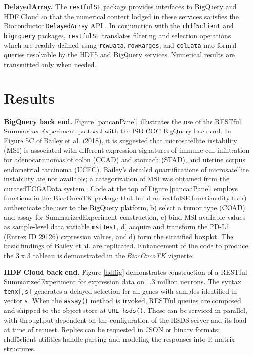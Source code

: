\documentclass[applications]{gen-bioinformatics}
\newcommand{\Rpackage}[1]{{\textit{#1}}}
\begin{document}
\noindent
\textbf{DelayedArray.}
The \verb+restfulSE+ package provides interfaces to 
BigQuery and HDF Cloud so that 
the numerical content lodged in these services
satisfies the Bioconductor \verb+DelayedArray+ API \citep{Pages2018}.  
In conjunction with the \verb+rhdf5client+ and \verb+bigrquery+ packages,
\verb+restfulSE+ translates filtering and selection operations
which are readily defined using \verb+rowData+, \verb+rowRanges+,
and \verb+colData+ into formal queries resolvable by the HDF5 and
BigQuery services.  Numerical results are transmitted only when needed.

\section*{Results}

\textbf{BigQuery back end.} Figure \ref{pancanPanel} illustrates the 
use of the RESTful SummarizedExperiment protocol
with the ISB-CGC BigQuery back end.  In Figure 5C
of Bailey et al. (2018), it is suggested that
microsatellite instability (MSI) is associated with
different expression signatures of immune cell infiltration
for adenocarcinomas of colon (COAD) and stomach (STAD), and
uterine corpus endometrial carcinoma (UCEC).  Bailey's
detailed quantifications of microsatellite instability
are not available; a categorization of MSI was
obtained from the curatedTCGAData system \citep{Ramos2017}.
Code at the top of Figure \ref{pancanPanel} employs
functions in the BiocOncoTK package that build on
restfulSE functionality to a) authenticate the
user to the BigQuery platform, b) select a tumor
type (COAD) and assay for SummarizedExperiment
construction, c) bind MSI available values as
sample-level data variable \verb+msiTest+, d)
acquire and transform the PD-L1 
(Entrez ID 29126)
expression values, and d) form the stratified boxplot. 
The basic findings of Bailey et al. are replicated.
Enhancement of the code to produce the 3 x 3 tableau
is demonstrated in the \Rpackage{BiocOncoTK} vignette.

\noindent
\textbf{HDF Cloud back end.}  Figure \ref{hdffig}
demonstrates construction of a RESTful SummarizedExperiment
for expression data on 1.3 million neurons.
The syntax \verb+tenx[,s]+ generates a delayed selection for
all genes with samples 
identified in vector \verb+s+.  When the \verb+assay()+
method is invoked, RESTful queries are composed and
shipped to the object store at \verb+URL_hsds()+.
These can be serviced in parallel, with
throughput dependent on the configuration
of the HSDS server and its load at time of request.
Replies can be requested in JSON or binary formats;
rhdf5client utilities handle parsing and modeling the
responses into R matrix structures.
\end{document}
